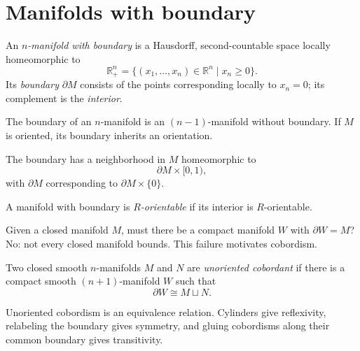 \section{Manifolds with boundary}
\label{section-manifolds-with-boundary}

\begin{definition}
\label{at-definition-boundary-manifold}
An \emph{$n$-manifold with boundary} is a
Hausdorff, second-countable space locally
homeomorphic to
$$
\mathbb{R}_+^n
=\{(x_1,\ldots,x_n)\in\mathbb{R}^n
\mid x_n\geq0\}.
$$
Its \emph{boundary} $\partial M$ consists
of the points corresponding locally to
$x_n=0$; its complement is the
\emph{interior}.
\end{definition}

\begin{remark}
\label{at-remark-oriented-boundary}
The boundary of an $n$-manifold is an
$(n-1)$-manifold without boundary.  If $M$
is oriented, its boundary inherits an
orientation.
\end{remark}

\begin{proposition}
\label{at-proposition-boundary-collar}
The boundary has a neighborhood in $M$
homeomorphic to
$$
\partial M\times[0,1),
$$
with $\partial M$ corresponding to
$\partial M\times\{0\}$.
\end{proposition}

\begin{definition}
\label{at-definition-boundary-orientation}
A manifold with boundary is
\emph{$R$-orientable} if its interior is
$R$-orientable.
\end{definition}

\begin{remark}[Question]
\label{at-remark-does-manifold-bound}
Given a closed manifold $M$, must there be
a compact manifold $W$ with
$\partial W=M$?  No: not every closed
manifold bounds.  This failure motivates
cobordism.
\end{remark}

\begin{definition}
\label{at-definition-unoriented-cobordism}
Two closed smooth $n$-manifolds $M$ and
$N$ are \emph{unoriented cobordant} if
there is a compact smooth
$(n+1)$-manifold $W$ such that
$$
\partial W\cong M\sqcup N.
$$
\end{definition}

\begin{remark}
\label{at-remark-cobordism-equivalence}
Unoriented cobordism is an equivalence
relation.  Cylinders give reflexivity,
relabeling the boundary gives symmetry,
and gluing cobordisms along their common
boundary gives transitivity.
\end{remark}

